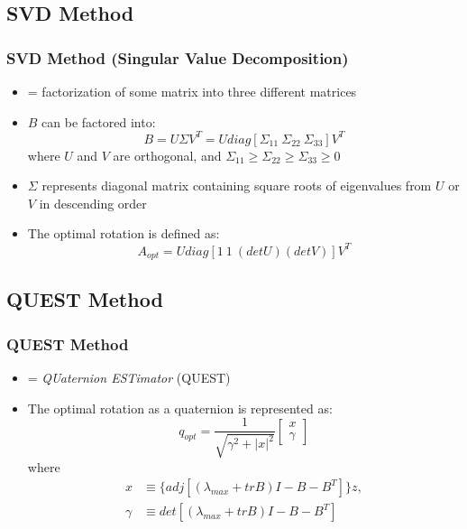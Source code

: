 \documentclass[11pt]{beamer}
\begin{document}
    \subsection{SVD Method}\label{subsec:svdMethod}
    \begin{frame}
        \frametitle{SVD Method (Singular Value Decomposition)}
        \begin{itemize}[<+->]
            \item  = factorization of some matrix into three different matrices \medskip
            \item $B$ can be factored into:
            \begin{equation}
                B = U \Sigma V^T = U diag \left[ \Sigma_{11} \ \Sigma_{22} \ \Sigma_{33} \right] V^T
            \end{equation}
            where $U$ and $V$ are orthogonal, and $\Sigma_{11} \geq \Sigma_{22} \geq \Sigma_{33} \geq 0$ \medskip
            \item $\Sigma$ represents diagonal matrix containing square roots of eigenvalues from $U$ or $V$ in
            descending order \medskip
            \item The optimal rotation is defined as:
            \begin{equation}
                A_{opt} = U diag \left[ 1 \ 1 \ (det U)(det V) \right] V^T
            \end{equation}
        \end{itemize}
    \end{frame}

    \subsection{QUEST Method}\label{subsec:questMethod}
    \begin{frame}
        \frametitle{QUEST Method}
        \begin{itemize}[<+->]
            \item = \textit{QUaternion ESTimator} (QUEST) \medskip
            \item The optimal rotation as a quaternion is represented as:
            \begin{equation}
                q_{opt} = \frac{1}{\sqrt{\gamma^2 + |x|^2}}
                \begin{bmatrix}
                    x \\
                    \gamma
                \end{bmatrix}
            \end{equation}
            where
            \begin{align*}
                x &\equiv \{ adj[(\lambda_{max} + trB) I - B - B^T] \} z, \\
                \gamma &\equiv det[(\lambda_{max} + trB) I - B - B^T]
            \end{align*}
        \end{itemize}
    \end{frame}
\end{document}
